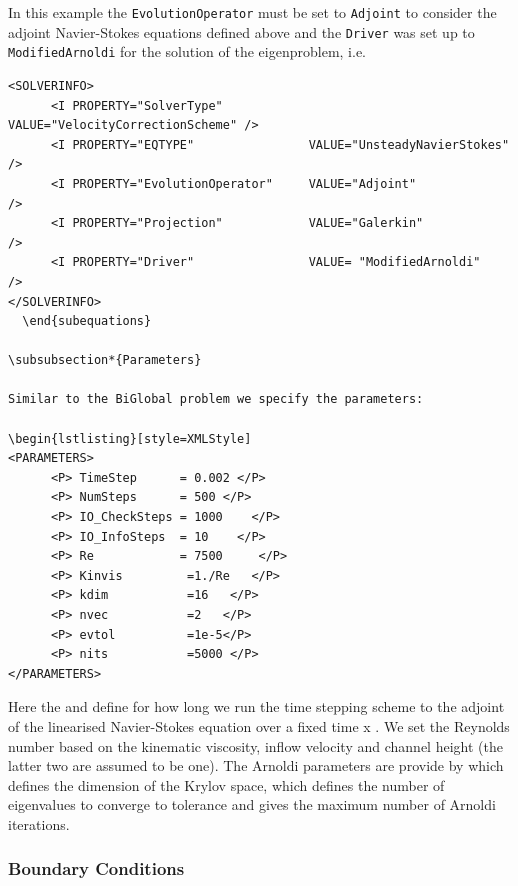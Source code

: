 In this example the \texttt{EvolutionOperator} must be set to
\texttt{Adjoint} to consider the adjoint Navier-Stokes equations
defined above and the \texttt{Driver} was set up to
\texttt{ModifiedArnoldi} for the solution of the eigenproblem, i.e.

    \begin{lstlisting}[style=XMLStyle]
<SOLVERINFO>
      <I PROPERTY="SolverType"            VALUE="VelocityCorrectionScheme" />
      <I PROPERTY="EQTYPE"                VALUE="UnsteadyNavierStokes"     />
      <I PROPERTY="EvolutionOperator"     VALUE="Adjoint"                  />
      <I PROPERTY="Projection"            VALUE="Galerkin"                 />
      <I PROPERTY="Driver"                VALUE= "ModifiedArnoldi"         />
</SOLVERINFO>
  \end{subequations}

\subsubsection*{Parameters}

Similar to the BiGlobal problem we specify the parameters: 

\begin{lstlisting}[style=XMLStyle]
<PARAMETERS>
      <P> TimeStep      = 0.002 </P>
      <P> NumSteps      = 500 </P>
      <P> IO_CheckSteps = 1000    </P>
      <P> IO_InfoSteps  = 10    </P>
      <P> Re            = 7500     </P>
      <P> Kinvis         =1./Re   </P>
      <P> kdim           =16   </P>
      <P> nvec           =2   </P>
      <P> evtol          =1e-5</P>
      <P> nits           =5000 </P>
</PARAMETERS>
  \end{lstlisting}

    Here the  and  define for how long
    we run the time stepping scheme to the adjoint of the linearised
    Navier-Stokes equation over a fixed time  x
    . We set the Reynolds number based on the
    kinematic viscosity, inflow velocity and channel height (the
    latter two are assumed to be one). The Arnoldi parameters are
    provide by  which defines the dimension of the Krylov
    space,  which defines the number of eigenvalues to
    converge to tolerance  and  gives the
    maximum number of Arnoldi iterations.


    \subsubsection*{Boundary Conditions}

